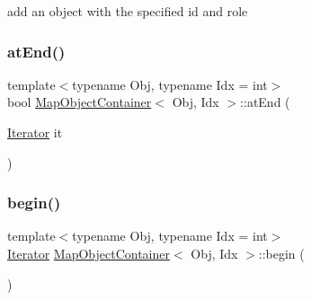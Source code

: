 add an object with the specified id and role 

\mbox{\label{class_map_object_container_af908d67a323fdb8540e395dda61e1172}} 
\subsubsection{\texorpdfstring{atEnd()}{atEnd()}}
{\footnotesize\ttfamily template$<$typename Obj, typename Idx = int$>$ \\
bool \mbox{\hyperlink{class_map_object_container}{Map\+Object\+Container}}$<$ Obj, Idx $>$\+::at\+End (\begin{DoxyParamCaption}\item[{\mbox{\hyperlink{class_map_object_container_a744f6940937741a8ffd125e146dc86ab}{Iterator}}}]{it }\end{DoxyParamCaption})\hspace{0.3cm}{\ttfamily [inline]}}

\mbox{\label{class_map_object_container_a578d70a39de94f7b8e0edd625eb97ef2}} 
\subsubsection{\texorpdfstring{begin()}{begin()}}
{\footnotesize\ttfamily template$<$typename Obj, typename Idx = int$>$ \\
\mbox{\hyperlink{class_map_object_container_a744f6940937741a8ffd125e146dc86ab}{Iterator}} \mbox{\hyperlink{class_map_object_container}{Map\+Object\+Container}}$<$ Obj, Idx $>$\+::begin (\begin{DoxyParamCaption}{ }\end{DoxyParamCaption})\hspace{0.3cm}{\ttfamily [inline]}}

\mbox{\label{class_map_object_container_ae620f6d22864720c1a8b8815de46de7f}} 
